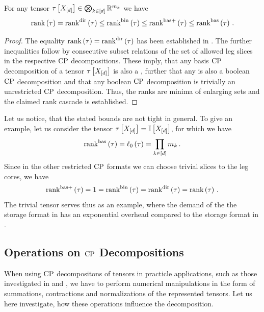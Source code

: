 \begin{theorem}
    \label{the:rankCascade}
    For any tensor $\tau\left[X_{[d]}\right]\in\bigotimes_{k\in[d]} \mathbb{R}^{m_{k}}$ we have
    \begin{align*}
        \mathrm{rank}\left(\tau\right) = \mathrm{rank}^{\mathrm{dir}}\left(\tau\right) \leq \mathrm{rank}^{\mathrm{bin}}\left(\tau\right) \leq \mathrm{rank}^{\mathrm{bas+}}\left(\tau\right) \leq \mathrm{rank}^{\mathrm{bas}}\left(\tau\right) \, .
    \end{align*}
\end{theorem}
\begin{proof}
    The equality $\mathrm{rank}\left(\tau\right) = \mathrm{rank}^{\mathrm{dir}}\left(\tau\right)$ has been established in .
    The further inequalities follow by consecutive subset relations of the set of allowed leg slices in the respective $\mathrm{CP}$ decompositions.
    These imply, that any basis $\mathrm{CP}$ decomposition of a tensor $\tau\left[X_{[d]}\right]$ is also a \basplusDecomposition{}, further that any \basplusDecomposition{} is also a boolean $\mathrm{CP}$ decomposition and that any boolean $\mathrm{CP}$ decomposition is trivially an unrestricted $\mathrm{CP}$ decomposition.
    Thus, the ranks are minima of enlarging sets and the claimed rank cascade is established.
\end{proof}

Let us notice, that the stated bounds are not tight in general.
To give an example, let us consider the tensor $\tau\left[X_{[d]}\right]=\mathbb{I}\left[X_{[d]}\right]$, for which we have
\begin{align*}
    \mathrm{rank}^{\mathrm{bas}}\left(\tau\right) = \ell_0\left(\tau\right) = \prod_{k\in[d]}m_{k} \, .
\end{align*}
Since in the other restricted $\mathrm{CP}$ formats we can choose trivial slices to the leg cores, we have
\begin{align*}
    \mathrm{rank}^{\mathrm{bas+}}\left(\tau\right) = 1 = \mathrm{rank}^{\mathrm{bin}}\left(\tau\right) = \mathrm{rank}^{\mathrm{dir}}\left(\tau\right) = \mathrm{rank}\left(\tau\right) \, .
\end{align*}
The trivial tensor serves thus as an example, where the demand of the the storage format in  has an exponential overhead compared to the storage format in .


\subsection{Operations on $\mathrm{CP}$ Decompositions}

When using $\mathrm{CP}$ decompositons of tensors in practicle applications, such as those investigated in  and , we have to perform numerical manipulations in the form of summations, contractions and normalizations of the represented tensors.
Let us here investigate, how these operations influence the decomposition.

